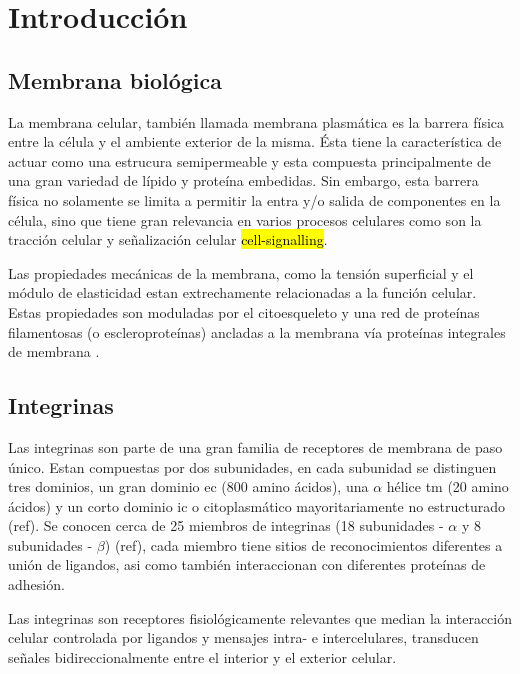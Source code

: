 \chapter{Introducción}

\section{Membrana biológica}

La membrana celular, también llamada membrana plasmática es la barrera física entre la célula y el ambiente exterior de la misma.  Ésta tiene la característica de actuar como una estrucura semipermeable y esta compuesta principalmente de una gran variedad de lípido y proteína embedidas. Sin embargo, esta barrera física no solamente se limita a permitir la entra y/o salida de componentes en la célula, sino que tiene gran relevancia en varios procesos celulares como son la tracción celular y señalización celular \hl{cell-signalling}. 


Las propiedades mecánicas de la membrana, como la tensión superficial y el módulo de elasticidad estan extrechamente relacionadas a la función celular. Estas propiedades son moduladas por el citoesqueleto y una red de proteínas filamentosas (o escleroproteínas)  ancladas a la membrana vía proteínas integrales de membrana \cite{Vinogradova2002, Karagoz2021}.

\section{Integrinas}

Las integrinas son parte de una gran familia de receptores de membrana de paso único. Estan compuestas por dos subunidades, en cada subunidad se distinguen tres dominios, un gran dominio \ac{ec} (800 amino ácidos), una $\alpha$ hélice \ac{tm} (20 amino ácidos) y un corto dominio \ac{ic} o citoplasmático mayoritariamente no estructurado (ref). Se conocen cerca de 25 miembros de integrinas (18 subunidades - $\alpha$  y 8 subunidades - $\beta$) (ref), cada miembro tiene sitios de reconocimientos diferentes a unión de ligandos, asi como también interaccionan con diferentes proteínas de adhesión.


Las integrinas son receptores fisiológicamente relevantes que median la interacción celular controlada por ligandos y mensajes intra- e intercelulares, transducen señales bidireccionalmente entre el interior y el exterior celular.


